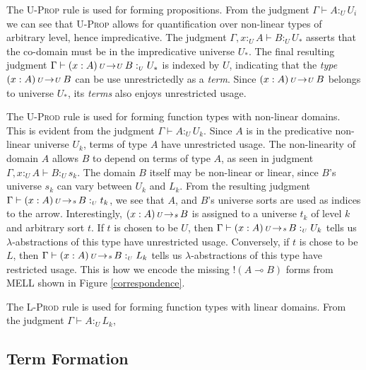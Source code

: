 \documentclass{article}
\theoremstyle{definition}
\newcommand{\rname}[1]{\textsc{\footnotesize #1}}
\newcommand{\utype}{:_{\scriptscriptstyle U}}
\newcommand{\arw}[2]
{\hspace*{0.2em}{\scriptstyle #1}\hspace*{-0.2em}
\rightarrow
\hspace*{-0.2em}{\scriptstyle #2}\hspace*{0.2em}}
\begin{document}
  The \rname{U-Prop} rule is used for forming propositions. From the judgment $\Gamma \vdash A \utype U_i$ we can see that \rname{U-Prop} allows for quantification over non-linear types of arbitrary level, hence impredicative. The judgment $\Gamma, x \utype A \vdash B \utype U_*$ asserts that the co-domain must be in the impredicative universe $U_*$. The final resulting judgment $\Gamma \vdash (x : A) \arw{U}{U} B \utype U_*$ is indexed by $U$, indicating that the \textit{type} $(x : A) \arw{U}{U} B$ can be use unrestrictedly as a \textit{term}. Since $(x : A) \arw{U}{U} B$ belongs to universe $U_*$, its \textit{terms} also enjoys unrestricted usage.

  The \rname{U-Prod} rule is used for forming function types with non-linear domains. This is evident from the judgment $\Gamma \vdash A \utype U_k$. Since $A$ is in the predicative non-linear universe $U_k$, terms of type $A$ have unrestricted usage. The non-linearity of domain $A$ allows $B$ to depend on terms of type $A$, as seen in judgment $\Gamma, x \utype A \vdash B \utype s_k$. The domain $B$ itself may be non-linear or linear, since $B$'s universe $s_k$ can vary between $U_k$ and $L_k$. From the resulting judgment $\Gamma \vdash (x : A) \arw{U}{s} B \utype t_k$, we see that $A$, and $B$'s universe sorts are used as indices to the arrow. Interestingly, $(x : A) \arw{U}{s} B$ is assigned to a universe $t_k$ of level $k$ and arbitrary sort $t$. If $t$ is chosen to be $U$, then $\Gamma \vdash (x : A) \arw{U}{s} B \utype U_k$ tells us $\lambda$-abstractions of this type have unrestricted usage. Conversely, if $t$ is chose to be $L$, then $\Gamma \vdash (x : A) \arw{U}{s} B \utype L_k$ tells us $\lambda$-abstractions of this type have restricted usage. This is how we encode the missing $!(A \multimap B)$ forms from MELL shown in Figure \ref{correspondence}.

  The \rname{L-Prod} rule is used for forming function types with linear domains. From the judgment $\Gamma \vdash A \utype L_k$,
  
  \subsection{Term Formation} \label{teformation}
\end{document}
